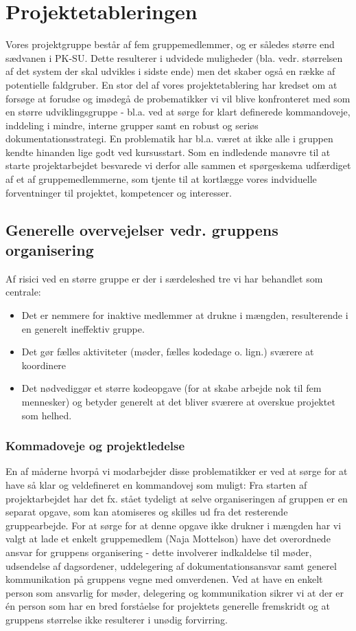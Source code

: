 \documentclass[10pt,a4paper,danish]{article}
\begin{document}
\section{Projektetableringen}
Vores projektgruppe består af fem gruppemedlemmer, og er således større end sædvanen i PK-SU. Dette resulterer i udvidede muligheder (bla. vedr. størrelsen af det system der skal udvikles i sidste ende) men det skaber også en række af potentielle faldgruber. En stor del af vores projektetablering har kredset om at forsøge at forudse og imødegå de probematikker vi vil blive konfronteret med som en større udviklingsgruppe - bl.a. ved at sørge for klart definerede kommandoveje, inddeling i mindre, interne grupper samt en robust og seriøs dokumentationsstrategi. En problematik har bl.a. været at ikke alle i gruppen kendte hinanden lige godt ved kursusstart. Som en indledende manøvre til at starte projektarbejdet besvarede vi derfor alle sammen et spørgeskema udfærdiget af et af gruppemedlemmerne, som tjente til at kortlægge vores indviduelle forventninger til projektet, kompetencer og interesser.  

\subsection{Generelle overvejelser vedr. gruppens organisering}
Af risici ved en større gruppe er der i særdeleshed tre vi har behandlet som centrale: 
\begin{itemize}
\item Det er nemmere for inaktive medlemmer at drukne i mængden, resulterende i en generelt ineffektiv gruppe.
\item Det gør fælles aktiviteter (møder, fælles kodedage o. lign.) sværere at koordinere
\item Det nødvediggør et større kodeopgave (for at skabe arbejde nok til fem mennesker) og betyder generelt at det bliver sværere at overskue projektet som helhed. 
\end{itemize}

\subsubsection{Kommadoveje og projektledelse}
En af måderne hvorpå vi modarbejder disse problematikker er ved at sørge for at have så klar og veldefineret en kommandovej som muligt: Fra starten af projektarbejdet har det fx. stået tydeligt at selve organiseringen af gruppen er en separat opgave, som kan atomiseres og skilles ud fra det resterende gruppearbejde. For at sørge for at denne opgave ikke drukner i mængden har vi valgt at lade et enkelt gruppemedlem (Naja Mottelson) have det overordnede ansvar for gruppens organisering - dette involverer indkaldelse til møder, udsendelse af dagsordener, uddelegering af dokumentationsansvar samt generel kommunikation på gruppens vegne med omverdenen. Ved at have en enkelt person som ansvarlig for møder, delegering og kommunikation sikrer vi at der er én person som har en bred forståelse for projektets generelle fremskridt og at gruppens størrelse ikke resulterer i unødig forvirring. 
\end{document}
